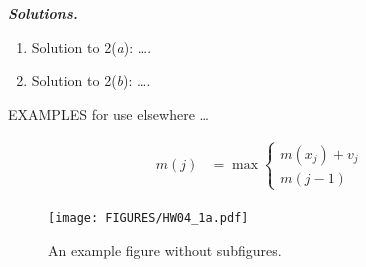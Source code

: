 \documentclass{article}
\begin{document}
\begin{enumerate}[label=\textbf{(\arabic*)}]
\vspace{0.1in}


\textbf{\textit{Solutions.}}
  \begin{enumerate} %
  
    \item Solution to 2(\textit{a}): \ldots.
    
    \vspace{0.1in}
    
    \item Solution  to 2(\textit{b}): \ldots.

  \end{enumerate} %

\vspace{0.1in}

\clearpage

\end{enumerate}

EXAMPLES for use elsewhere \ldots


\begin{align}
        m(j)
        &=
        \max{}
        \begin{cases}
        m(x_j) + v_j\\
        m(j-1)
        \end{cases}
\end{align}


\begin{figure}[hbtp]
    \captionsetup{font=small, width = 10cm}
    \centering
       \centering
       \texttt{[image: FIGURES/HW04\_1a.pdf]}
    \caption{An example figure without subfigures.}
    \label{fig:Example_Figure_Without_Subfigures}
\end{figure}

\end{document}
